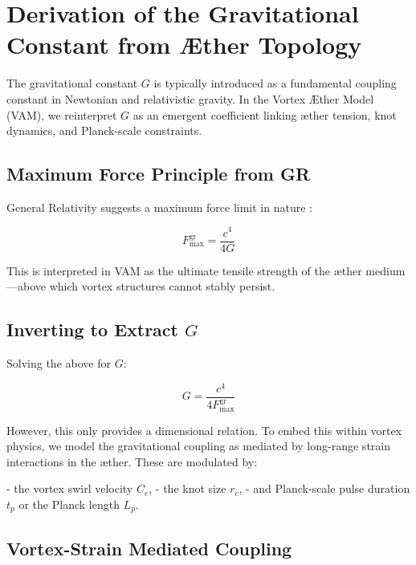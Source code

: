 
\section{Derivation of the Gravitational Constant from Æther Topology}
\label{appendix:G}

The gravitational constant \( G \) is typically introduced as a fundamental coupling constant in Newtonian and relativistic gravity. In the Vortex Æther Model (VAM), we reinterpret \( G \) as an emergent coefficient linking æther tension, knot dynamics, and Planck-scale constraints.

\subsection*{Maximum Force Principle from GR}

General Relativity suggests a maximum force limit in nature \cite{scharf2016force, barcelo2011}:

\begin{equation}
    F^{\text{gr}}_{\text{max}} = \frac{c^4}{4G}
\end{equation}

This is interpreted in VAM as the ultimate tensile strength of the æther medium—above which vortex structures cannot stably persist.

\subsection*{Inverting to Extract \( G \)}

Solving the above for \( G \):

\begin{equation}
    G = \frac{c^4}{4 F^{\text{gr}}_{\text{max}}}
\end{equation}

However, this only provides a dimensional relation. To embed this within vortex physics, we model the gravitational coupling as mediated by long-range strain interactions in the æther. These are modulated by:

- the vortex swirl velocity \( C_e \),
- the knot size \( r_c \),
- and Planck-scale pulse duration \( t_p \) or the Planck length \( L_p \).

\subsection*{Vortex-Strain Mediated Coupling}

